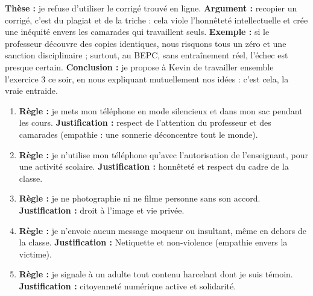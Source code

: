 \documentclass[11pt]{article}
\newcommand{\cle}[1]{{\popxbold\color{popdark}#1}}
\begin{document}
\begin{corrige}
\textbf{Thèse :} je refuse d'utiliser le corrigé trouvé en ligne. \textbf{Argument :} recopier un corrigé, c'est du \cle{plagiat} et de la triche : cela viole l'honnêteté intellectuelle et crée une inéquité envers les camarades qui travaillent seuls. \textbf{Exemple :} si le professeur découvre des copies identiques, nous risquons tous un zéro et une sanction disciplinaire ; surtout, au BEPC, sans entraînement réel, l'échec est presque certain. \textbf{Conclusion :} je propose à Kevin de travailler ensemble l'exercice 3 ce soir, en nous expliquant mutuellement nos idées : c'est cela, la vraie entraide.
\end{corrige}

\begin{corrige}
\begin{enumerate}
\item \textbf{Règle :} je mets mon téléphone en mode silencieux et dans mon sac pendant les cours. \textbf{Justification :} respect de l'attention du professeur et des camarades (empathie : une sonnerie déconcentre tout le monde).
\item \textbf{Règle :} je n'utilise mon téléphone qu'avec l'autorisation de l'enseignant, pour une activité scolaire. \textbf{Justification :} honnêteté et respect du cadre de la classe.
\item \textbf{Règle :} je ne photographie ni ne filme personne sans son accord. \textbf{Justification :} \cle{droit à l'image} et \cle{vie privée}.
\item \textbf{Règle :} je n'envoie aucun message moqueur ou insultant, même en dehors de la classe. \textbf{Justification :} \cle{Netiquette} et non-violence (empathie envers la victime).
\item \textbf{Règle :} je signale à un adulte tout contenu harcelant dont je suis témoin. \textbf{Justification :} \cle{citoyenneté numérique} active et solidarité.
\end{enumerate}
\end{corrige}
\end{document}
